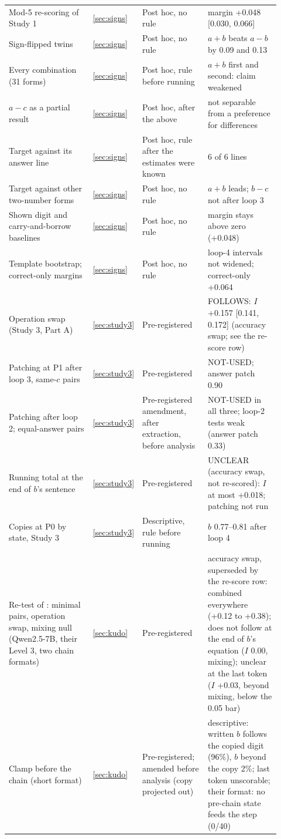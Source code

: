 \documentclass{article}
\begin{document}
{\begin{longtable}{@{}L{0.33\linewidth}L{0.06\linewidth}L{0.25\linewidth}L{0.28\linewidth}@{}}
Mod-5 re-scoring of Study 1 & \ref{sec:signs} & Post hoc, no rule & margin +0.048 [0.030, 0.066] \\
Sign-flipped twins & \ref{sec:signs} & Post hoc, no rule & $a+b$ beats $a-b$ by 0.09 and 0.13 \\
Every combination (31 forms) & \ref{sec:signs} & Post hoc, rule before running & $a+b$ first and second: claim weakened \\
$a-c$ as a partial result & \ref{sec:signs} & Post hoc, after the above & not separable from a preference for differences \\
Target against its answer line & \ref{sec:signs} & Post hoc, rule after the estimates were known & 6 of 6 lines \\
Target against other two-number forms & \ref{sec:signs} & Post hoc, no rule & $a+b$ leads; $b-c$ not after loop 3 \\
Shown digit and carry-and-borrow baselines & \ref{sec:signs} & Post hoc, no rule & margin stays above zero (+0.048) \\
Template bootstrap; correct-only margins & \ref{sec:signs} & Post hoc, no rule & loop-4 intervals not widened; correct-only +0.064 \\
Operation swap (Study 3, Part A) & \ref{sec:study3} & Pre-registered & FOLLOWS: $I$ +0.157 [0.141, 0.172] (accuracy swap; see the re-score row) \\
Patching at P1 after loop 3, same-$c$ pairs & \ref{sec:study3} & Pre-registered & NOT-USED; answer patch 0.90 \\
Patching after loop 2; equal-answer pairs & \ref{sec:study3} & Pre-registered amendment, after extraction, before analysis & NOT-USED in all three; loop-2 tests weak (answer patch 0.33) \\
Running total at the end of $b$'s sentence & \ref{sec:study3} & Pre-registered & UNCLEAR (accuracy swap, not re-scored): $I$ at most +0.018; patching not run \\
Copies at P0 by state, Study 3 & \ref{sec:study3} & Descriptive, rule before running & $b$ 0.77--0.81 after loop 4 \\
Re-test of \citet{kudo2026}: minimal pairs, operation swap, mixing null (Qwen2.5-7B, their Level 3, two chain formats) & \ref{sec:kudo} & Pre-registered & accuracy swap, superseded by the re-score row: combined everywhere (+0.12 to +0.38); does not follow at the end of $b$'s equation ($I$ 0.00, mixing); unclear at the last token ($I$ +0.03, beyond mixing, below the 0.05 bar) \\
Clamp before the chain (short format) & \ref{sec:kudo} & Pre-registered; amended before analysis (copy projected out) & descriptive: written $b$ follows the copied digit (96\%), $b$ beyond the copy 2\%; last token unscorable; their format: no pre-chain state feeds the step (0/40) \\

\end{longtable}}
\end{document}
